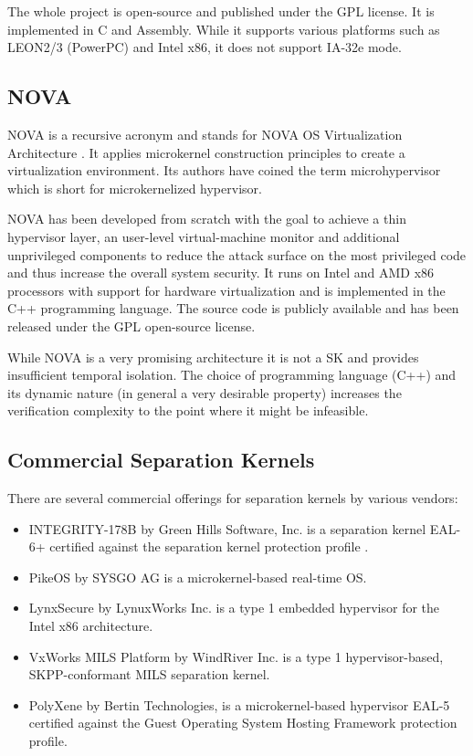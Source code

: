 The whole project is open-source and published under the GPL license. It is
implemented in C and Assembly. While it supports various platforms such as
LEON2/3 (PowerPC) and Intel x86, it does not support IA-32e mode.

\subsection{NOVA}
NOVA is a recursive acronym and stands for NOVA OS Virtualization Architecture
\cite{Steinberg:2010:NMS:1755913.1755935}. It applies microkernel construction
principles to create a virtualization environment. Its authors have coined
the term microhypervisor which is short for
microkernelized hypervisor.

NOVA has been developed from scratch with the goal to achieve a thin hypervisor
layer, an user-level virtual-machine monitor and additional unprivileged
components to reduce the attack surface on the most privileged code and thus
increase the overall system security. It runs on Intel and AMD x86 processors
with support for hardware virtualization and is implemented in the C++
programming language. The source code is publicly available \cite{NOVA} and has
been released under the GPL open-source license.

While NOVA is a very promising architecture it is not a SK and provides
insufficient temporal isolation. The choice of programming language (C++) and
its dynamic nature (in general a very desirable property) increases the
verification complexity to the point where it might be infeasible.

\subsection{Commercial Separation Kernels}\label{subsec:commercial-sks}
There are several commercial offerings for separation kernels by various
vendors:

\begin{itemize}
	\item INTEGRITY-178B by Green Hills Software, Inc. is a separation kernel
		EAL-6+ certified against the separation kernel protection profile
		\cite{SKPP}.
	\item PikeOS by SYSGO AG is a microkernel-based real-time OS.
	\item LynxSecure by LynuxWorks Inc. is a type 1 embedded hypervisor for the
		Intel x86 architecture.
	\item VxWorks MILS Platform by WindRiver Inc. is a type 1 hypervisor-based,
		SKPP-conformant MILS separation kernel.
	\item PolyXene by Bertin Technologies, is a microkernel-based hypervisor
		EAL-5 certified against the Guest Operating System Hosting Framework
		protection profile.
\end{itemize}

